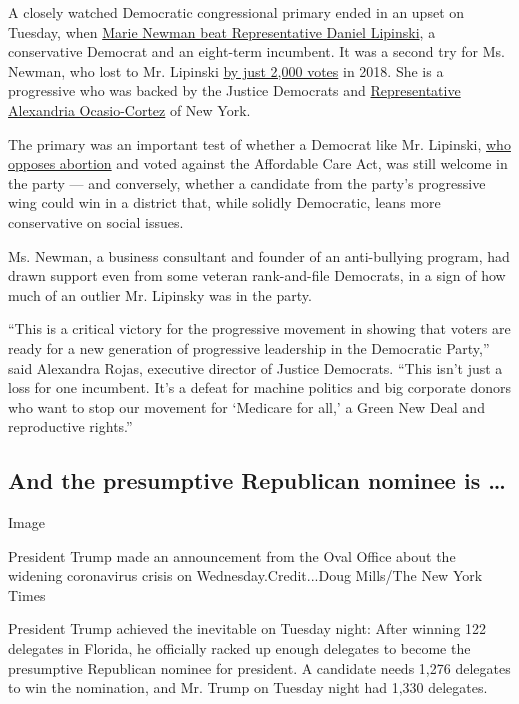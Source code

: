 A closely watched Democratic congressional primary ended in an upset on
Tuesday, when
\href{https://www.nytimes3xbfgragh.onion/2020/03/18/us/politics/marie-newman-dan-lipinski-illinois.html}{Marie
Newman beat Representative Daniel Lipinski}, a conservative Democrat and
an eight-term incumbent. It was a second try for Ms. Newman, who lost to
Mr. Lipinski
\href{https://www.nytimes3xbfgragh.onion/elections/results/illinois-house-district-3-primary-election}{by
just 2,000 votes} in 2018. She is a progressive who was backed by the
Justice Democrats and
\href{https://www.nytimes3xbfgragh.onion/2019/09/17/us/politics/aoc-endorsement-marie-newman.html}{Representative
Alexandria Ocasio-Cortez} of New York.

The primary was an important test of whether a Democrat like Mr.
Lipinski,
\href{https://www.nytimes3xbfgragh.onion/2019/05/22/us/politics/dan-lipinski-abortion-cheri-bustos.html}{who
opposes abortion} and voted against the Affordable Care Act, was still
welcome in the party --- and conversely, whether a candidate from the
party's progressive wing could win in a district that, while solidly
Democratic, leans more conservative on social issues.

Ms. Newman, a business consultant and founder of an anti-bullying
program, had drawn support even from some veteran rank-and-file
Democrats, in a sign of how much of an outlier Mr. Lipinsky was in the
party.

``This is a critical victory for the progressive movement in showing
that voters are ready for a new generation of progressive leadership in
the Democratic Party,'' said Alexandra Rojas, executive director of
Justice Democrats. ``This isn't just a loss for one incumbent. It's a
defeat for machine politics and big corporate donors who want to stop
our movement for `Medicare for all,' a Green New Deal and reproductive
rights.''

\hypertarget{and-the-presumptive-republican-nominee-is-}{%
\subsection{And the presumptive Republican nominee is
\ldots{}}\label{and-the-presumptive-republican-nominee-is-}}

Image

President Trump made an announcement from the Oval Office about the
widening coronavirus crisis on Wednesday.Credit...Doug Mills/The New
York Times

President Trump achieved the inevitable on Tuesday night: After winning
122 delegates in Florida, he officially racked up enough delegates to
become the presumptive Republican nominee for president. A candidate
needs 1,276 delegates to win the nomination, and Mr. Trump on Tuesday
night had 1,330 delegates.

